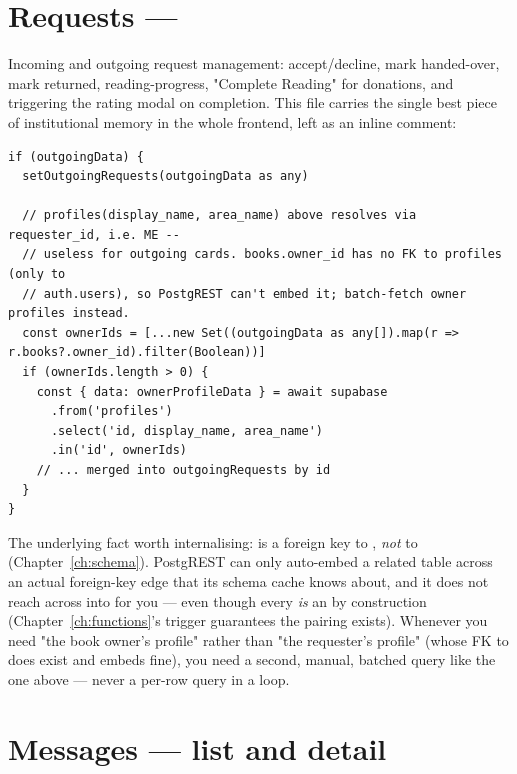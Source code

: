 \section{Requests — }
\label{sec:requests-page}

Incoming and outgoing request management: accept/decline, mark handed-over, mark returned, reading-progress, "Complete Reading" for donations, and triggering the rating modal on completion. This file carries the single best piece of institutional memory in the whole frontend, left as an inline comment:

\begin{lstlisting}[caption={app/(dashboard)/requests/page.tsx — a bug fix explained in-place}]
if (outgoingData) {
  setOutgoingRequests(outgoingData as any)

  // profiles(display_name, area_name) above resolves via requester_id, i.e. ME --
  // useless for outgoing cards. books.owner_id has no FK to profiles (only to
  // auth.users), so PostgREST can't embed it; batch-fetch owner profiles instead.
  const ownerIds = [...new Set((outgoingData as any[]).map(r => r.books?.owner_id).filter(Boolean))]
  if (ownerIds.length > 0) {
    const { data: ownerProfileData } = await supabase
      .from('profiles')
      .select('id, display_name, area_name')
      .in('id', ownerIds)
    // ... merged into outgoingRequests by id
  }
}
\end{lstlisting}

The underlying fact worth internalising:  is a foreign key to , \emph{not} to  (Chapter~\ref{ch:schema}). PostgREST can only auto-embed a related table across an actual foreign-key edge that its schema cache knows about, and it does not reach across  into  for you — even though every  \emph{is} an  by construction (Chapter~\ref{ch:functions}'s  trigger guarantees the pairing exists). Whenever you need "the book owner's profile" rather than "the requester's profile" (whose FK to  does exist and embeds fine), you need a second, manual, batched query like the one above — never a per-row query in a loop.

\section{Messages — list and detail}

